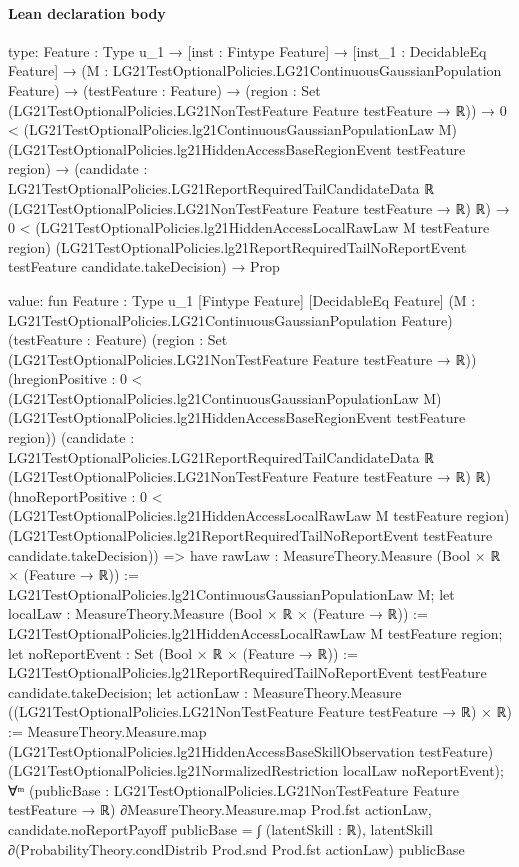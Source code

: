 \documentclass[10pt]{article}
\begin{document}
\paragraph{Lean declaration body}
\begin{ReviewVerbatim}
type:
{Feature : Type u_1} →
  [inst : Fintype Feature] →
    [inst_1 : DecidableEq Feature] →
      (M : LG21TestOptionalPolicies.LG21ContinuousGaussianPopulation Feature) →
        (testFeature : Feature) →
          (region : Set (LG21TestOptionalPolicies.LG21NonTestFeature Feature testFeature → ℝ)) →
            0 <
                (LG21TestOptionalPolicies.lg21ContinuousGaussianPopulationLaw M)
                  (LG21TestOptionalPolicies.lg21HiddenAccessBaseRegionEvent testFeature region) →
              (candidate :
                  LG21TestOptionalPolicies.LG21ReportRequiredTailCandidateData ℝ
                    (LG21TestOptionalPolicies.LG21NonTestFeature Feature testFeature → ℝ) ℝ) →
                0 <
                    (LG21TestOptionalPolicies.lg21HiddenAccessLocalRawLaw M testFeature region)
                      (LG21TestOptionalPolicies.lg21ReportRequiredTailNoReportEvent testFeature
                        candidate.takeDecision) →
                  Prop

value:
fun {Feature : Type u_1} [Fintype Feature] [DecidableEq Feature]
    (M : LG21TestOptionalPolicies.LG21ContinuousGaussianPopulation Feature) (testFeature : Feature)
    (region : Set (LG21TestOptionalPolicies.LG21NonTestFeature Feature testFeature → ℝ))
    (hregionPositive :
      0 <
        (LG21TestOptionalPolicies.lg21ContinuousGaussianPopulationLaw M)
          (LG21TestOptionalPolicies.lg21HiddenAccessBaseRegionEvent testFeature region))
    (candidate :
      LG21TestOptionalPolicies.LG21ReportRequiredTailCandidateData ℝ
        (LG21TestOptionalPolicies.LG21NonTestFeature Feature testFeature → ℝ) ℝ)
    (hnoReportPositive :
      0 <
        (LG21TestOptionalPolicies.lg21HiddenAccessLocalRawLaw M testFeature region)
          (LG21TestOptionalPolicies.lg21ReportRequiredTailNoReportEvent testFeature candidate.takeDecision)) =>
  have rawLaw : MeasureTheory.Measure (Bool × ℝ × (Feature → ℝ)) :=
    LG21TestOptionalPolicies.lg21ContinuousGaussianPopulationLaw M;
  let localLaw : MeasureTheory.Measure (Bool × ℝ × (Feature → ℝ)) :=
    LG21TestOptionalPolicies.lg21HiddenAccessLocalRawLaw M testFeature region;
  let noReportEvent : Set (Bool × ℝ × (Feature → ℝ)) :=
    LG21TestOptionalPolicies.lg21ReportRequiredTailNoReportEvent testFeature candidate.takeDecision;
  let actionLaw : MeasureTheory.Measure ((LG21TestOptionalPolicies.LG21NonTestFeature Feature testFeature → ℝ) × ℝ) :=
    MeasureTheory.Measure.map (LG21TestOptionalPolicies.lg21HiddenAccessBaseSkillObservation testFeature)
      (LG21TestOptionalPolicies.lg21NormalizedRestriction localLaw noReportEvent);
  ∀ᵐ (publicBase :
    LG21TestOptionalPolicies.LG21NonTestFeature Feature testFeature → ℝ) ∂MeasureTheory.Measure.map Prod.fst actionLaw,
    candidate.noReportPayoff publicBase =
      ∫ (latentSkill : ℝ), latentSkill ∂(ProbabilityTheory.condDistrib Prod.snd Prod.fst actionLaw) publicBase
\end{ReviewVerbatim}
\end{document}
